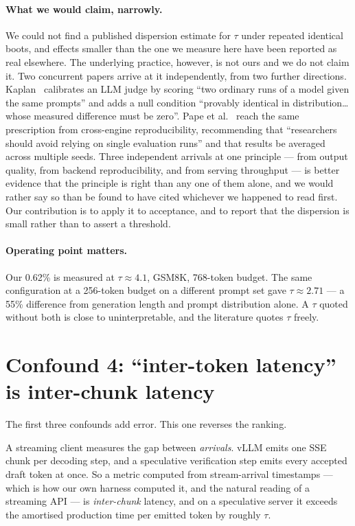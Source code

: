 \documentclass[11pt]{article}
\begin{document}
\paragraph{What we would claim, narrowly.} We could not find a published
dispersion estimate for $\tau$ under repeated identical boots, and effects
smaller than the one we measure here have been reported as real elsewhere.
The underlying practice, however, is not ours and we do not claim it. Two
concurrent papers arrive at it independently, from two further directions.
Kaplan~\cite{kaplan2026calibrated} calibrates an LLM judge by scoring ``two
ordinary runs of a model given the same prompts'' and adds a null condition
``provably identical in distribution\ldots whose measured difference must be
zero''. Pape et al.~\cite{pape2026silent} reach the same prescription from
cross-engine reproducibility, recommending that ``researchers should avoid
relying on single evaluation runs'' and that results be averaged across
multiple seeds. Three independent arrivals at one principle --- from output
quality, from backend reproducibility, and from serving throughput --- is
better evidence that the principle is right than any one of them alone, and
we would rather say so than be found to have cited whichever we happened to
read first. Our contribution is to apply it to acceptance, and to report
that the dispersion is small rather than to assert a threshold.

\paragraph{Operating point matters.} Our 0.62\% is measured at
$\tau \approx 4.1$, GSM8K, 768-token budget. The same configuration at a
256-token budget on a different prompt set gave $\tau \approx 2.71$ --- a
55\% difference from generation length and prompt distribution alone. A
$\tau$ quoted without both is close to uninterpretable, and the literature
quotes $\tau$ freely.

\section{Confound 4: ``inter-token latency'' is inter-chunk latency}\label{sec:c4}

The first three confounds add error. This one reverses the ranking.

A streaming client measures the gap between \emph{arrivals}. vLLM emits one
SSE chunk per decoding step, and a speculative verification step emits every
accepted draft token at once. So a metric computed from stream-arrival
timestamps --- which is how our own harness computed it, and the natural
reading of a streaming API --- is \emph{inter-chunk} latency, and on a
speculative server it exceeds the amortised production time per emitted
token by roughly $\tau$.
\end{document}
